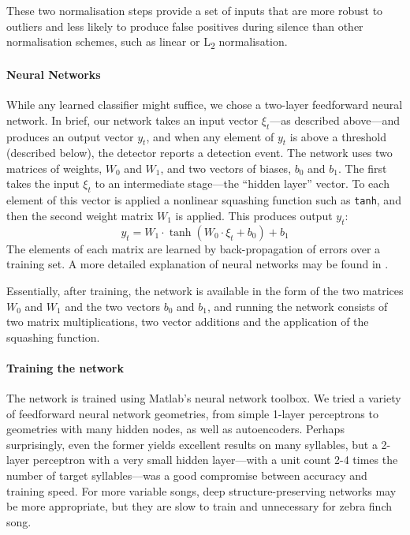 \documentclass[10pt,letterpaper]{article}
\let\oldmarginpar\marginpar
\renewcommand{\marginpar}[1]{\oldmarginpar{\linespread{1}\scriptsize{#1}}}
\renewcommand{\subsubsection}[1]{\paragraph{#1}}
\begin{document}
These two normalisation steps provide a set of inputs that are more
robust to outliers and less likely to produce false positives during 
silence than other normalisation schemes, such as 
linear or L\textsubscript{2} normalisation.

\subsubsection{Neural Networks}

While any learned classifier might suffice, we chose a two-layer feedforward neural network.  In brief, our network takes an input vector $\xi_t$---as described above---and produces an output vector $y_t$, and when any element of $y_t$ is above a threshold (described below), the detector reports a detection event.  The network uses two matrices of weights, $W_0$ and $W_1$, and two vectors of biases, $b_0$ and $b_1$.  The first takes the input $\xi_t$ to an intermediate stage---the ``hidden layer'' vector.  To each element of this vector is applied a nonlinear squashing function such as {\tt tanh}, and then the second weight matrix $W_1$ is applied.  This produces output $y_t$:
\begin{equation*}
  y_t = W_1 \cdot \tanh (W_0 \cdot \xi_t + b_0) + b_1
\end{equation*}
The elements of each matrix are learned by back-propagation of errors over a training set.  A more detailed explanation of neural networks may be found in \cite{hkp}.

Essentially, after training, the network is available in the form of the two matrices $W_0$ and $W_1$ and the two vectors $b_0$ and $b_1$, and running the network consists of two matrix multiplications, two vector additions and the application of the squashing function.\marginpar{I've left some other details.  Ok?}

\subsubsection{Training the network}

The network is trained using Matlab's neural network toolbox. We tried
a variety of feedforward neural network geometries, from simple
1-layer perceptrons to geometries with many hidden
nodes, as well as autoencoders. Perhaps surprisingly, even the former yields excellent results
on many syllables, but a 2-layer perceptron with a very small hidden
layer---with a unit count 2-4 times the number of target
syllables---was a good compromise between accuracy and training
speed. For more variable
songs, deep structure-preserving networks may be more appropriate, but
they are slow to train and unnecessary for zebra finch song.
\end{document}
